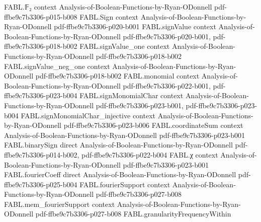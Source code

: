 \begin{theorem}
\label{FABL.one_sub_two_mul_relativeHammingDist_le_abs_fourierCoeff}
\leanok
{}
\proofstep
  {FABL.𝔽₂}
  {context}
  {Analysis-of-Boolean-Functions-by-Ryan-ODonnell}
  {pdf-ffbe9c7b3306-p015-b008}
\proofstep
  {FABL.Sign}
  {context}
  {Analysis-of-Boolean-Functions-by-Ryan-ODonnell}
  {pdf-ffbe9c7b3306-p020-b001}
\proofstep
  {FABL.signValue}
  {context}
  {Analysis-of-Boolean-Functions-by-Ryan-ODonnell}
  {pdf-ffbe9c7b3306-p020-b001,
    pdf-ffbe9c7b3306-p018-b002}
\proofstep
  {FABL.signValue_one}
  {context}
  {Analysis-of-Boolean-Functions-by-Ryan-ODonnell}
  {pdf-ffbe9c7b3306-p018-b002}
\proofstep
  {FABL.signValue_neg_one}
  {context}
  {Analysis-of-Boolean-Functions-by-Ryan-ODonnell}
  {pdf-ffbe9c7b3306-p018-b002}
\proofstep
  {FABL.monomial}
  {context}
  {Analysis-of-Boolean-Functions-by-Ryan-ODonnell}
  {pdf-ffbe9c7b3306-p022-b001,
    pdf-ffbe9c7b3306-p023-b004}
\proofstep
  {FABL.signMonomialChar}
  {context}
  {Analysis-of-Boolean-Functions-by-Ryan-ODonnell}
  {pdf-ffbe9c7b3306-p023-b001,
    pdf-ffbe9c7b3306-p023-b004}
\proofstep
  {FABL.signMonomialChar_injective}
  {context}
  {Analysis-of-Boolean-Functions-by-Ryan-ODonnell}
  {pdf-ffbe9c7b3306-p023-b006}
\proofstep
  {FABL.coordinateSum}
  {context}
  {Analysis-of-Boolean-Functions-by-Ryan-ODonnell}
  {pdf-ffbe9c7b3306-p023-b001}
\proofstep
  {FABL.binarySign}
  {direct}
  {Analysis-of-Boolean-Functions-by-Ryan-ODonnell}
  {pdf-ffbe9c7b3306-p014-b002,
    pdf-ffbe9c7b3306-p022-b004}
\proofstep
  {FABL.χ}
  {context}
  {Analysis-of-Boolean-Functions-by-Ryan-ODonnell}
  {pdf-ffbe9c7b3306-p023-b001}
\proofstep
  {FABL.fourierCoeff}
  {direct}
  {Analysis-of-Boolean-Functions-by-Ryan-ODonnell}
  {pdf-ffbe9c7b3306-p025-b004}
\proofstep
  {FABL.fourierSupport}
  {context}
  {Analysis-of-Boolean-Functions-by-Ryan-ODonnell}
  {pdf-ffbe9c7b3306-p027-b008}
\proofstep
  {FABL.mem_fourierSupport}
  {context}
  {Analysis-of-Boolean-Functions-by-Ryan-ODonnell}
  {pdf-ffbe9c7b3306-p027-b008}
\proofstep
  {FABL.granularityFrequencyWithin}

\end{theorem}
